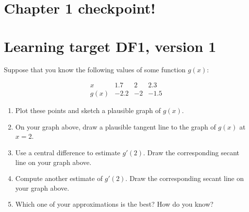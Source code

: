 
\usepackage{pgfplots}


%


\allowdisplaybreaks
\section{Chapter 1 checkpoint!}
\section{Learning target DF1, version 1}


\everymath{\displaystyle}

Suppose that you know the following values of some function $g(x)$:

\[
\begin{array}{c||r|r|r}
      x  &  1.7 &  2   &  2.3 \\\hline
    g(x) & -2.2 & -2   & -1.5
\end{array}
\]
\begin{enumerate}[leftmargin=0pt]

\item Plot these points and sketch a plausible graph of $g(x)$.


\item On your graph above, draw a plausible tangent line to the graph of $g(x)$ at $x=2$.

\item Use a central difference to estimate $g'(2)$. Draw the corresponding secant line on your graph above.

\vfill

\item Compute another estimate of $g'(2)$. Draw the corresponding secant line on your graph above.

\vfill

\item Which one of your approximations is the best? How do you know?

\vspace{1cm}

\end{enumerate}

